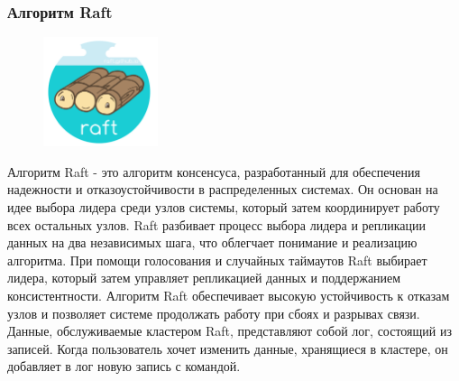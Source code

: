 \documentclass[pdf, 10pt, unicode,aspectratio=169]{beamer} %
\begin{document}
\begin{frame}
\frametitle{Алгоритм Raft}

\begin{figure}
\includegraphics[width=0.3\textwidth]{raft_pic.png}
\end{figure}

Алгоритм Raft - это алгоритм консенсуса, разработанный для обеспечения надежности и отказоустойчивости в распределенных системах. Он основан на идее выбора лидера среди узлов системы, который затем координирует работу всех остальных узлов. Raft разбивает процесс выбора лидера и репликации данных на два независимых шага, что облегчает понимание и реализацию алгоритма. При помощи голосования и случайных таймаутов Raft выбирает лидера, который затем управляет репликацией данных и поддержанием консистентности. Алгоритм Raft обеспечивает высокую устойчивость к отказам узлов и позволяет системе продолжать работу при сбоях и разрывах связи. Данные, обслуживаемые кластером Raft, представляют собой лог, состоящий из записей. Когда пользователь хочет изменить данные, хранящиеся в кластере, он добавляет в лог новую запись с командой.

\end{frame}
\end{document}
